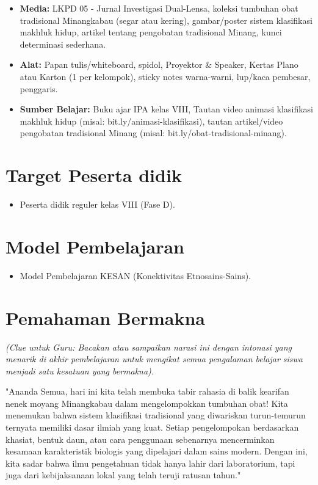 \documentclass[a4paper,12pt]{article}
\begin{document}
\begin{itemize}
\item \textbf{Media:} LKPD 05 - Jurnal Investigasi Dual-Lensa, koleksi tumbuhan obat tradisional Minangkabau (segar atau kering), gambar/poster sistem klasifikasi makhluk hidup, artikel tentang pengobatan tradisional Minang, kunci determinasi sederhana.
\item \textbf{Alat:} Papan tulis/whiteboard, spidol, Proyektor \& Speaker, Kertas Plano atau Karton (1 per kelompok), sticky notes warna-warni, lup/kaca pembesar, penggaris.
\item \textbf{Sumber Belajar:} Buku ajar IPA kelas VIII, Tautan video animasi klasifikasi makhluk hidup (misal: bit.ly/animasi-klasifikasi), tautan artikel/video pengobatan tradisional Minang (misal: bit.ly/obat-tradisional-minang).
\end{itemize}

\section{Target Peserta didik}

\begin{itemize}
\item Peserta didik reguler kelas VIII (Fase D).
\end{itemize}

\section{Model Pembelajaran}

\begin{itemize}
\item Model Pembelajaran KESAN (Konektivitas Etnosains-Sains).
\end{itemize}

\section{Pemahaman Bermakna}
\textit{(Clue untuk Guru: Bacakan atau sampaikan narasi ini dengan intonasi yang menarik di akhir pembelajaran untuk mengikat semua pengalaman belajar siswa menjadi satu kesatuan yang bermakna).}

\begin{tcolorbox}[sectionbox]
"Ananda Semua, hari ini kita telah membuka tabir rahasia di balik kearifan nenek moyang Minangkabau dalam mengelompokkan tumbuhan obat! Kita menemukan bahwa sistem klasifikasi tradisional yang diwariskan turun-temurun ternyata memiliki dasar ilmiah yang kuat. Setiap pengelompokan berdasarkan khasiat, bentuk daun, atau cara penggunaan sebenarnya mencerminkan kesamaan karakteristik biologis yang dipelajari dalam sains modern. Dengan ini, kita sadar bahwa ilmu pengetahuan tidak hanya lahir dari laboratorium, tapi juga dari kebijaksanaan lokal yang telah teruji ratusan tahun."
\end{tcolorbox}
\end{document}
